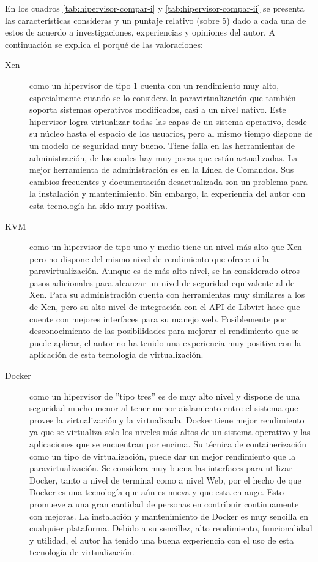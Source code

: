 En los cuadros \ref{tab:hipervisor-compar-i} y \ref{tab:hipervisor-compar-ii} se presenta las características consideras y un puntaje relativo (sobre 5) dado a cada una de estos de acuerdo a investigaciones, experiencias y opiniones del autor. A continuación se explica el porqué de las valoraciones:
\begin{description}
	\item[Xen] como un hipervisor de tipo 1 cuenta con un rendimiento muy alto, especialmente cuando se lo considera la paravirtualización que también soporta sistemas operativos modificados, casi a un nivel nativo. Este hipervisor logra virtualizar todas las capas de un sistema operativo, desde su núcleo hasta el espacio de los usuarios, pero al mismo tiempo dispone de un modelo de seguridad muy bueno. Tiene falla en las herramientas de administración, de los cuales hay muy pocas que están actualizadas. La mejor herramienta de administración es en la Línea de Comandos. Sus cambios frecuentes y documentación desactualizada son un problema para la instalación y mantenimiento. Sin embargo, la experiencia del autor con esta tecnología ha sido muy positiva.
    \item[KVM] como un hipervisor de tipo uno y medio tiene un nivel más alto que Xen pero no dispone del mismo nivel de rendimiento que ofrece ni la paravirtualización. Aunque es de más alto nivel, se ha considerado otros pasos adicionales para alcanzar un nivel de seguridad equivalente al de Xen. Para su administración cuenta con herramientas muy similares a los de Xen, pero su alto nivel de integración con el API de Libvirt hace que cuente con mejores interfaces para su manejo web. Posiblemente por desconocimiento de las posibilidades para mejorar el rendimiento que se puede aplicar, el autor no ha tenido una experiencia muy positiva con la aplicación de esta tecnología de virtualización.
    \item[Docker] como un hipervisor de ''tipo tres'' es de muy alto nivel y dispone de una seguridad mucho menor al tener menor aislamiento entre el sistema que provee la virtualización y la virtualizada. Docker tiene mejor rendimiento ya que se virtualiza solo los niveles más altos de un sistema operativo y las aplicaciones que se encuentran por encima. Su técnica de containerización como un tipo de virtualización, puede dar un mejor rendimiento que la paravirtualización. Se considera muy buena las interfaces para utilizar Docker, tanto a nivel de terminal como a nivel Web, por el hecho de que Docker es una tecnología que aún es nueva y que esta en auge. Esto promueve a una gran cantidad de personas en contribuir continuamente con mejoras. La instalación y mantenimiento de Docker es muy sencilla en cualquier plataforma. Debido a su sencillez, alto rendimiento, funcionalidad y utilidad, el autor ha tenido una buena experiencia con el uso de esta tecnología de virtualización. 
\end{description}

